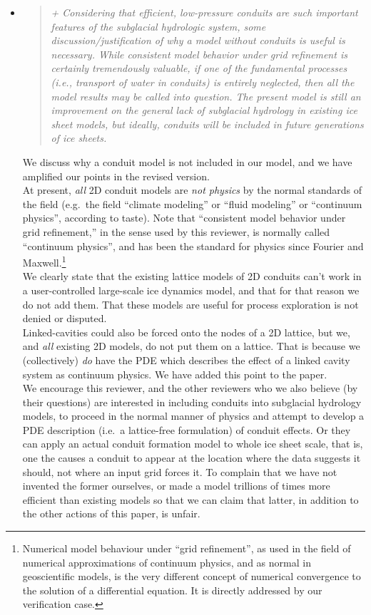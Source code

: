 \documentclass[11pt,reqno]{amsart}
\newcommand{\reply}[2]{
\medskip\medskip
\item  \begin{quote}
\emph{#1}
\end{quote}

\medskip
\noindent #2}
\begin{document}
\begin{itemize}
\reply{+ Considering that efficient, low-pressure conduits are such important features of the subglacial hydrologic system, some discussion/justification of why a model without conduits is useful is necessary.  While consistent model behavior under grid refinement is certainly tremendously valuable, if one of the fundamental processes (i.e., transport of water in conduits) is entirely neglected, then all the model results may be called into question.  The present model is still an improvement on the general lack of subglacial hydrology in existing ice sheet models, but ideally, conduits will be included in future generations of ice sheets.}
{We discuss why a conduit model is not included in our model, and we have amplified our points in the revised version.\\
\indent  At present, \emph{all} 2D conduit models are \emph{not physics} by the normal standards of the field (e.g.~the field ``climate modeling'' or ``fluid modeling'' or ``continuum physics'', according to taste).  Note that ``consistent model behavior under grid refinement,'' in the sense used by this reviewer, is normally called ``continuum physics'', and has been the standard for physics since Fourier and Maxwell.\footnote{Numerical model behaviour under ``grid refinement'', as used in the field of numerical approximations of continuum physics, and as normal in geoscientific models, is the very different concept of numerical convergence to the solution of a differential equation.  It is directly addressed by our verification case.} \\
\indent We clearly state that the existing lattice models of 2D conduits can't work in a user-controlled large-scale ice dynamics model, and that for that reason we do not add them.  That these models are useful for process exploration is not denied or disputed.\\
\indent Linked-cavities could also be forced onto the nodes of a 2D lattice, but we, and \emph{all} existing 2D models, do not put them on a lattice.  That is because we (collectively) \emph{do} have the PDE which describes the effect of a linked cavity system as continuum physics.  We have added this point to the paper. \\
\indent We encourage this reviewer, and the other reviewers who we also believe (by their questions) are interested in including conduits into subglacial hydrology models, to proceed in the normal manner of physics and attempt to develop a PDE description (i.e.~a lattice-free formulation) of conduit effects.  Or they can apply an actual conduit formation model to whole ice sheet scale, that is, one the causes a conduit to appear at the location where the data suggests it should, not where an input grid forces it.  To complain that we have not invented the former ourselves, or made a model trillions of times more efficient than existing models so that we can claim that latter, in addition to the other actions of this paper, is unfair.\\
}
\end{itemize}
\end{document}

